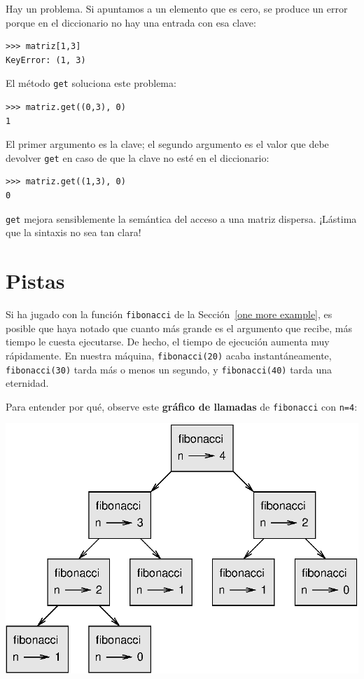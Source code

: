 Hay un problema. Si apuntamos a un elemento que es cero, se produce un error porque en el diccionario no hay una entrada con esa clave:


\beforeverb
\begin{verbatim}
>>> matriz[1,3]
KeyError: (1, 3)
\end{verbatim}
\afterverb
%
El método \texttt{get} soluciona este problema:

\beforeverb
\begin{verbatim}
>>> matriz.get((0,3), 0)
1
\end{verbatim}
\afterverb
%
El primer argumento es la clave; el segundo argumento es el valor que debe devolver \texttt{get} en caso de que la clave no esté en el diccionario:

\beforeverb
\begin{verbatim}
>>> matriz.get((1,3), 0)
0
\end{verbatim}
\afterverb
%
\texttt{get} mejora sensiblemente la semántica del acceso a una matriz dispersa. ¡Lástima que la  sintaxis no sea tan clara!


\section{Pistas}

Si ha jugado con la función \texttt{fibonacci} de la Sección~\ref{one more example}, es posible que haya notado que cuanto más grande es el argumento que recibe, más tiempo le cuesta ejecutarse. De hecho, el tiempo de ejecución aumenta muy rápidamente. En nuestra máquina, \texttt{fibonacci(20)} acaba instantáneamente, \texttt{fibonacci(30)} tarda más o menos un segundo, y \texttt{fibonacci(40)} tarda una eternidad.

Para entender por qué, observe este {\bf gráfico de llamadas} de \texttt{fibonacci} con \texttt{n=4}:

\beforefig
\centerline{\includegraphics{illustrations/fibonacci.eps}}
\afterfig

